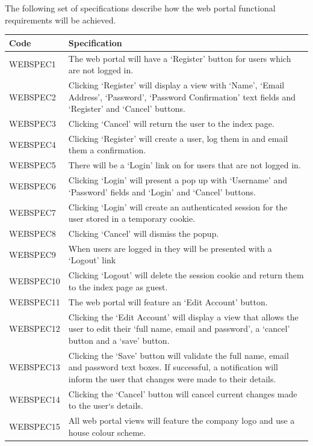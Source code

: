 \documentclass[11pt,a4paper]{article}
\begin{document}
The following set of specifications describe how the web portal functional requirements will be achieved.

\begin{longtable}{|p{2.5cm}p{13cm}|}
\hline
\textbf{Code} & \textbf{Specification} \\

\hline
WEBSPEC1 & The web portal will have a `Register' button for users which are not logged in. \\ \hline
WEBSPEC2 & Clicking `Register' will display a view with `Name', `Email Address', `Password', `Password Confirmation' text fields and `Register' and `Cancel' buttons.\\ \hline
WEBSPEC3 & Clicking `Cancel' will return the user to the index page.\\ \hline
WEBSPEC4 & Clicking `Register' will create a user, log them in and email them a confirmation. \\ \hline
WEBSPEC5 & There will be a `Login' link on for users that are not logged in.\\ \hline
WEBSPEC6 & Clicking `Login' will present a pop up with `Username' and `Password' fields and `Login' and `Cancel' buttons. \\ \hline
WEBSPEC7 & Clicking `Login' will create an authenticated session for the user stored in a temporary cookie.\\ \hline
WEBSPEC8 & Clicking `Cancel' will dismiss the popup. \\ \hline
WEBSPEC9 & When users are logged in they will be presented with a `Logout' link\\ \hline
WEBSPEC10 & Clicking `Logout' will delete the session cookie and return them to the index page as guest. \\ \hline
WEBSPEC11 & The web portal will feature an `Edit Account' button. \\ \hline
WEBSPEC12 & Clicking the `Edit Account' will display a view that allows the user to edit their `full name, email and password', a `cancel' button and a `save' button. \\ \hline
WEBSPEC13 & Clicking the `Save' button will validate the full name, email and password text boxes. If successful, a notification will inform the user that changes were made to their details. \\ \hline
WEBSPEC14 & Clicking the `Cancel' button will cancel current changes made to the user`s details. \\ \hline
WEBSPEC15 & All web portal views will feature the company logo and use a house colour scheme. \\ \hline

\end{longtable}
\end{document}
